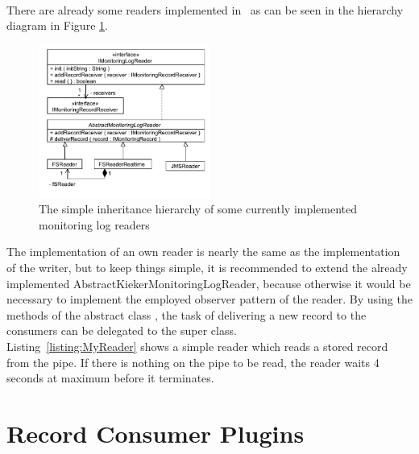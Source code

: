 \

		\noindent There are already some readers implemented in \Kieker\  as can be seen in the hierarchy diagram in Figure \ref{Figure:ReaderHierarchy}.

		\begin{figure}[H]
			\begin{centering}
				\includegraphics[width=0.5\textwidth]{images/kieker_readerimpls}
				\caption{The simple inheritance hierarchy of some currently implemented monitoring log readers}
				\label{Figure:ReaderHierarchy}
			\end{centering}
		\end{figure}

		\noindent The implementation of an own reader is nearly the same as the implementation of the writer, but to keep things simple, it is recommended to extend the already implemented AbstractKiekerMonitoringLogReader, because otherwise it would be necessary to implement the employed observer pattern of the reader. By using the methods of the abstract class , the task of delivering a new record to the consumers can be delegated to the super class.\\
		Listing~\ref{listing:MyReader} shows a simple reader which reads a stored record from the pipe. If there is nothing on the pipe to be read, the reader waits 4 seconds at maximum before it terminates.

		\setJavaCodeListing
		

	\section{Record Consumer Plugins}\label{sec:analysis:consumer}

